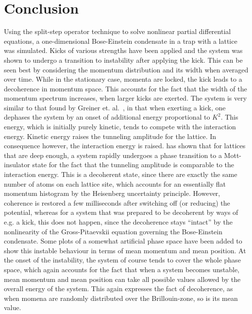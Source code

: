 \section{Conclusion}
Using the split-step operator technique to solve nonlinear partial differential equations, a one-dimensional Bose-Einstein condensate in a trap with a lattice was simulated. Kicks of various strengths have been applied and the system was shown to undergo a transition to instability after applying the kick. This can be seen best by considering the momentum distribution and its width when averaged over time. While in the stationary case, momenta are locked, the kick leads to a decoherence in momentum space. This accounts for the fact that the width of the momentum spectrum increases, when larger kicks are exerted. The system is very similar to that found by Greiner et. al.~\cite{esslinger}, in that when exerting a kick, one dephases the system by an onset of additional energy proportional to $K^2$.  This energy, which is initially purely kinetic, tends to compete with the interaction energy. Kinetic energy raises the tunneling amplitude for the lattice. In consequence however, the interaction energy is raised. \cite{esslinger} has shown that for lattices that are deep enough, a system rapidly undergoes a phase transition to a Mott-insulator state for the fact that the tunneling amplitude is comparable to the interaction energy. This is a decoherent state, since there are exactly the same number of atoms on each lattice site, which accounts for an essentially flat momentum histogram by the Heisenberg uncertainty principle. However, coherence is restored a few milliseconds after switching off (or reducing) the potential, whereas for a system that was prepared to be decoherent by ways of e.g. a kick, this does not happen, since the decoherence stays ``intact'' by the nonlinearity of the Gross-Pitaevskii equation governing the Bose-Einstein condensate.  Some plots of a somewhat artificial phase space have been added to show this instable behaviour in terms of mean momentum and mean position. At the onset of the instability, the system of course tends to cover the whole phase space, which again accounts for the fact that when a system becomes unstable, mean momentum and mean position can take all possible values allowed by the overall energy of the system. This again expresses the fact of decoherence, as when momena are randomly distributed over the Brillouin-zone, so is its mean value.

